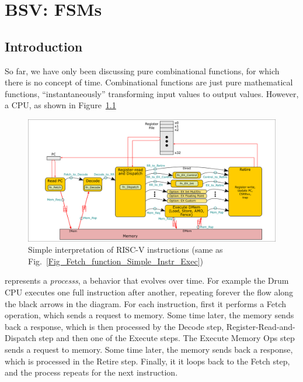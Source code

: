 

\chapter{BSV: FSMs}


\setcounter{page}{1}
\renewcommand{\thepage}{\arabic{chapter}-\arabic{page}}

\label{ch_FSMs}


\section{Introduction}


So far, we have only been discussing pure combinational functions, for
which there is no concept of time.  Combinational functions are just
pure mathematical functions, ``instantaneously'' transforming input
values to output values.  However, a CPU, as shown in
Figure~\ref{Fig_FSMs_Simple_Instr_Exec}
\begin{figure}[htbp]
  \centerline{\includegraphics[width=6in,angle=0]{Figures/Fig_Instr_Exec_w_structs}}
  \caption{\label{Fig_FSMs_Simple_Instr_Exec}
           Simple interpretation of RISC-V instructions
	   (same as Fig.~\ref{Fig_Fetch_function_Simple_Instr_Exec})}
\end{figure}
represents a \emph{processs}, a behavior that evolves over time.  For
example the Drum CPU executes one full instruction after another,
repeating forever the flow along the black arrows in the diagram. For
each instruction, first it performs a Fetch operation, which sends a
request to memory. Some time later, the memory sends back a response,
which is then processed by the Decode step, Register-Read-and-Dispatch
step and then one of the Execute steps.  The Execute Memory Ops step
sends a request to memory. Some time later, the memory sends back a
response, which is processed in the Retire step.  Finally, it it loops
back to the Fetch step, and the process repeats for the next
instruction.

